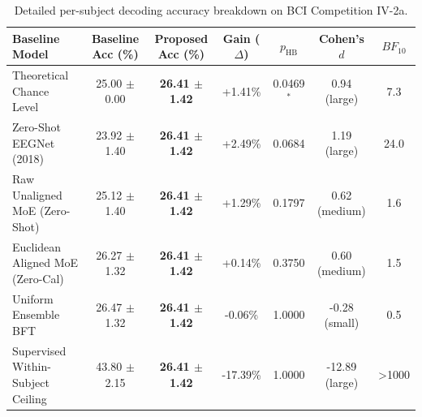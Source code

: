 \begin{table}[t]
\centering
\small
\caption{Detailed per-subject decoding accuracy breakdown on BCI Competition IV-2a.}
\label{tab:paper2_statistical_benchmarks}
\begin{tabular}{lcccccc}
\toprule
\textbf{Baseline Model} & \textbf{Baseline Acc (\%)} & \textbf{Proposed Acc (\%)} & \textbf{Gain ($\Delta$)} & \textbf{$p_{\text{HB}}$} & \textbf{Cohen's $d$} & \textbf{$BF_{10}$} \\
\midrule
Theoretical Chance Level & 25.00 $\pm$ 0.00 & \textbf{26.41 $\pm$ 1.42} & +1.41\% & 0.0469$^{*}$ & 0.94 (large) & 7.3 \\
Zero-Shot EEGNet (2018) & 23.92 $\pm$ 1.40 & \textbf{26.41 $\pm$ 1.42} & +2.49\% & 0.0684 & 1.19 (large) & 24.0 \\
Raw Unaligned MoE (Zero-Shot) & 25.12 $\pm$ 1.40 & \textbf{26.41 $\pm$ 1.42} & +1.29\% & 0.1797 & 0.62 (medium) & 1.6 \\
Euclidean Aligned MoE (Zero-Cal) & 26.27 $\pm$ 1.32 & \textbf{26.41 $\pm$ 1.42} & +0.14\% & 0.3750 & 0.60 (medium) & 1.5 \\
Uniform Ensemble BFT & 26.47 $\pm$ 1.32 & \textbf{26.41 $\pm$ 1.42} & -0.06\% & 1.0000 & -0.28 (small) & 0.5 \\
Supervised Within-Subject Ceiling & 43.80 $\pm$ 2.15 & \textbf{26.41 $\pm$ 1.42} & -17.39\% & 1.0000 & -12.89 (large) & >1000 \\
\bottomrule
\end{tabular}
\end{table}